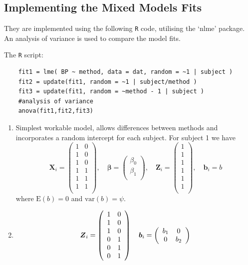 \documentclass[12pt, a4paper]{report}
\theoremstyle{plain}
\theoremstyle{definition}
\theoremstyle{remark}
\begin{document}
	\subsection{Implementing the Mixed Models Fits}
	They are implemented using the following {\tt{R}} code, utilising the
	`nlme' package. An analysis of variance is used to compare the model fits.
	
	The {\tt{R}} script:
	\begin{verbatim}
	fit1 = lme( BP ~ method, data = dat, random = ~1 | subject )
	fit2 = update(fit1, random = ~1 | subject/method )
	fit3 = update(fit1, random = ~method - 1 | subject )
	#analysis of variance
	anova(fit1,fit2,fit3)
	\end{verbatim}
	
	
	\begin{enumerate}
		
		
		\item Simplest workable model, allows differences between methods
		and incorporates a random intercept for each subject. For subject
		1 we have
		\[
		\boldsymbol{X}_i =
		\left(%
		\begin{array}{cc}
		1 & 0 \\
		1 & 0 \\
		1 & 0 \\
		1 & 1 \\
		1 & 1 \\
		1 & 1 \\
		\end{array}%
		\right),\quad
		\boldsymbol{\beta} =
		\left(%
		\begin{array}{c}
		\beta_0 \\
		\beta_1 \\
		\end{array}%
		\right), \quad
		\boldsymbol{Z}_i =
		\left(%
		\begin{array}{c}
		1 \\
		1 \\
		1 \\
		1 \\
		1 \\
		1 \\
		\end{array}%
		\right), \quad \boldsymbol{b}_i = b
		\]
		where $\mathrm{E}(b)=0$ and $\mathrm{var}(b)=\psi.$
		
		\item
		\[
		\boldsymbol{Z}_i =
		\left(%
		\begin{array}{c c}
		1 & 0 \\
		1 & 0 \\
		1 & 0 \\
		0 & 1 \\
		0 & 1 \\
		0 & 1 \\
		\end{array}%
		\right)
		\quad \boldsymbol{b}_i =
		\left(%
		\begin{array}{c c}
		b_1 & 0  \\
		0 & b_2  \\
		\end{array}%
		\right)
		\]
		

\end{enumerate}
\end{document}
